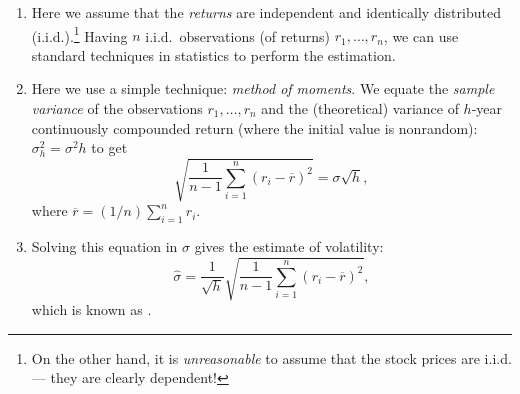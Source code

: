 \begin{enumerate}
\item Here we assume that the \emph{returns} are independent and identically
distributed (i.i.d.).\footnote{On the other hand, it is \emph{unreasonable} to
assume that the stock prices are i.i.d. --- they are clearly dependent!} Having
\(n\) i.i.d.\ observations (of returns) \(r_1,\dotsc,r_n\), we can use standard
techniques in statistics to perform the estimation.

\item Here we use a simple technique: \emph{method of moments}. We equate the
\emph{sample variance} of the observations \(r_1,\dotsc,r_n\) and the
(theoretical) variance of \(h\)-year continuously compounded return (where the
initial value is nonrandom): \(\sigma_h^2=\sigma^2h\) to get
\[
\sqrt{\frac{1}{n-1}\sum_{i=1}^{n}(r_i-\overline{r})^2}=\sigma\sqrt{h},
\]
where \(\overline{r}=(1/n)\sum_{i=1}^{n}r_i\).

\item \label{it:vol-mom-est-fmla}
Solving this equation in \(\sigma\) gives the estimate of volatility:
\[\widehat{\sigma}
=\frac{1}{\sqrt{h}}\sqrt{\frac{1}{n-1}\sum_{i=1}^{n}(r_i-\overline{r})^2},\]
which is known as .
\end{enumerate}

